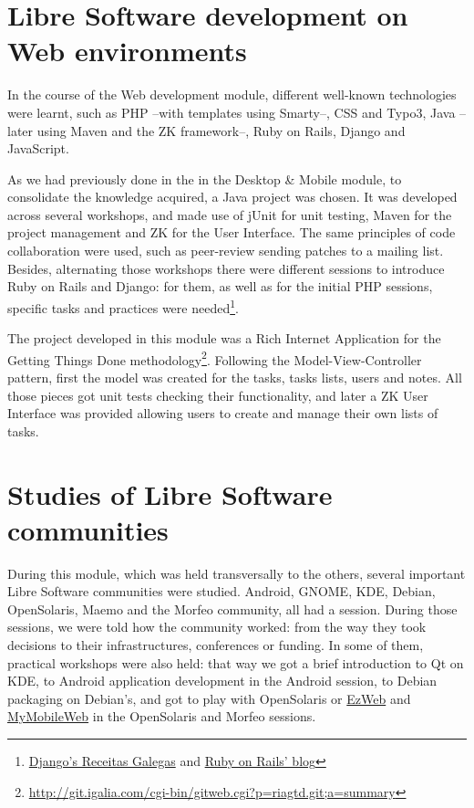 \section{Libre Software development on Web environments}

In the course of the Web development module, different well-known technologies were learnt, such as PHP --with templates using Smarty--, CSS and Typo3, Java --later using Maven and the ZK framework--, Ruby on Rails, Django and JavaScript.

As we had previously done in the in the Desktop \& Mobile module, to consolidate the knowledge acquired, a Java project was chosen.
It was developed across several workshops, and made use of jUnit for unit testing, Maven for the project management and ZK
for the User Interface. The same principles of code collaboration were used, such as peer-review sending patches to a mailing list.
Besides, alternating those workshops there were different sessions to introduce Ruby on Rails and Django: for them, as well
as for the initial PHP sessions, specific tasks and practices were needed\footnote{\href{https://forge.morfeo-project.org/plugins/scmsvn/viewcvs.php/trunk/spenap/dew/django/?root=freeswmaster}{Django's Receitas Galegas} and \href{https://forge.morfeo-project.org/plugins/scmsvn/viewcvs.php/trunk/spenap/dew/ror/?root=freeswmaster}{Ruby on Rails' blog}}.

The project developed in this module was a Rich Internet Application for the Getting Things Done methodology\footnote{\url{http://git.igalia.com/cgi-bin/gitweb.cgi?p=riagtd.git;a=summary}}. Following the
Model-View-Controller pattern, first the model was created for the tasks, tasks lists, users and notes. All those pieces got unit tests
checking their functionality, and later a ZK User Interface was provided allowing users to create and manage their own lists of tasks.

\section{Studies of Libre Software communities}

During this module, which was held transversally to the others, several important Libre Software
communities were studied. Android, GNOME, KDE, Debian, OpenSolaris, Maemo and the Morfeo community, all had a session. During those sessions, we
were told how the community worked: from the way they took decisions to their infrastructures, conferences or funding. In some of them,
practical workshops were also held: that way we got a brief introduction to Qt on KDE, to Android application development in the Android
session, to Debian packaging on Debian's, and got to play with OpenSolaris or \href{http://ezweb.morfeo-project.org/}{EzWeb} and \href{http://mymobileweb.morfeo-project.org/}{MyMobileWeb} in the OpenSolaris and Morfeo sessions.

